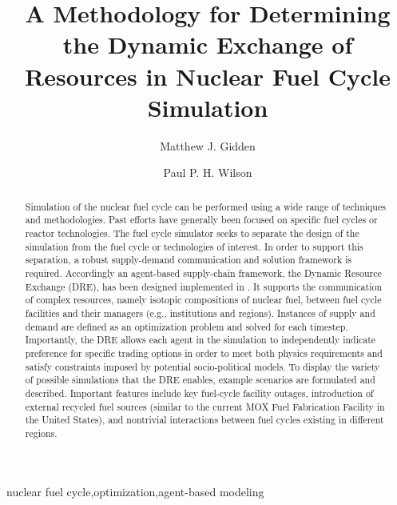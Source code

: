 

\begin{frontmatter}

\title{A Methodology for Determining the Dynamic Exchange of Resources in
  Nuclear Fuel Cycle Simulation}

\author[iiasa]{Matthew J. Gidden}
\address[iiasa]{International Institute for Applied Systems Analysis,
  Schlossplatz 1, A-2361 Laxenburg, Austria}
\author[uw]{Paul P. H. Wilson}
\address[uw]{University of Wisconsin - Madison, Department of Nuclear
  Engineering and Engineering Physics, Madison, WI 53706}

\begin{abstract}
Simulation of the nuclear fuel cycle can be performed using a wide range of
techniques and methodologies. Past efforts have generally been focused on
specific fuel cycles or reactor technologies. The \Cyclus fuel cycle simulator
seeks to separate the design of the simulation from the fuel cycle or
technologies of interest. In order to support this separation, a robust
supply-demand communication and solution framework is required. Accordingly
an agent-based supply-chain framework, the Dynamic Resource Exchange (DRE), has
been designed implemented in \Cyclus. It supports the communication of complex
resources, namely isotopic compositions of nuclear fuel, between fuel cycle
facilities and their managers (e.g., institutions and regions). Instances of
supply and demand are defined as an optimization problem and solved for each
timestep. Importantly, the DRE allows each agent in the simulation to independently
indicate preference for specific trading options in order to meet both physics 
requirements and satisfy constraints imposed by potential socio-political models.
To display the variety of possible simulations that the DRE enables,
example scenarios are formulated and described. Important features include key
fuel-cycle facility outages, introduction of external recycled fuel sources
(similar to the current MOX Fuel Fabrication Facility in the United States), and
nontrivial interactions between fuel cycles existing in different regions.
\end{abstract}

\begin{keyword}
nuclear fuel cycle\sep  optimization\sep agent-based modeling
\end{keyword}

\end{frontmatter}

\linenumbers
